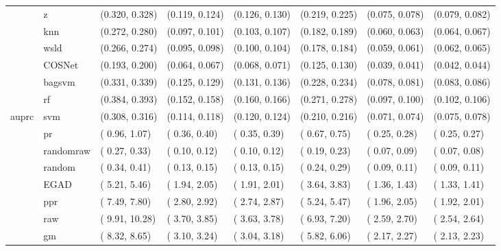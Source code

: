 \begin{table}[H]
{\begin{tabular}{llllllll}
 & z & (0.320, 0.328) & (0.119, 0.124) & (0.126, 0.130) & (0.219, 0.225) & (0.075, 0.078) & (0.079, 0.082)\\

 & knn & (0.272, 0.280) & (0.097, 0.101) & (0.103, 0.107) & (0.182, 0.189) & (0.060, 0.063) & (0.064, 0.067)\\

 & wsld & (0.266, 0.274) & (0.095, 0.098) & (0.100, 0.104) & (0.178, 0.184) & (0.059, 0.061) & (0.062, 0.065)\\

 & COSNet & (0.193, 0.200) & (0.064, 0.067) & (0.068, 0.071) & (0.125, 0.130) & (0.039, 0.041) & (0.042, 0.044)\\

 & bagsvm & (0.331, 0.339) & (0.125, 0.129) & (0.131, 0.136) & (0.228, 0.234) & (0.078, 0.081) & (0.083, 0.086)\\

 & rf & (0.384, 0.393) & (0.152, 0.158) & (0.160, 0.166) & (0.271, 0.278) & (0.097, 0.100) & (0.102, 0.106)\\

\multirow{-15}{*}{\raggedright\arraybackslash auprc} & svm & (0.308, 0.316) & (0.114, 0.118) & (0.120, 0.124) & (0.210, 0.216) & (0.071, 0.074) & (0.075, 0.078)\\
\cmidrule{1-8}
 & pr & ( 0.96,  1.07) & ( 0.36,  0.40) & ( 0.35,  0.39) & ( 0.67,  0.75) & ( 0.25,  0.28) & ( 0.25,  0.27)\\

 & randomraw & ( 0.27,  0.33) & ( 0.10,  0.12) & ( 0.10,  0.12) & ( 0.19,  0.23) & ( 0.07,  0.09) & ( 0.07,  0.08)\\

 & random & ( 0.34,  0.41) & ( 0.13,  0.15) & ( 0.13,  0.15) & ( 0.24,  0.29) & ( 0.09,  0.11) & ( 0.09,  0.11)\\

 & EGAD & ( 5.21,  5.46) & ( 1.94,  2.05) & ( 1.91,  2.01) & ( 3.64,  3.83) & ( 1.36,  1.43) & ( 1.33,  1.41)\\

 & ppr & ( 7.49,  7.80) & ( 2.80,  2.92) & ( 2.74,  2.87) & ( 5.24,  5.47) & ( 1.96,  2.05) & ( 1.92,  2.01)\\

 & raw & ( 9.91, 10.28) & ( 3.70,  3.85) & ( 3.63,  3.78) & ( 6.93,  7.20) & ( 2.59,  2.70) & ( 2.54,  2.64)\\

 & gm & ( 8.32,  8.65) & ( 3.10,  3.24) & ( 3.04,  3.18) & ( 5.82,  6.06) & ( 2.17,  2.27) & ( 2.13,  2.23)\\


\end{tabular}}
\end{table}
